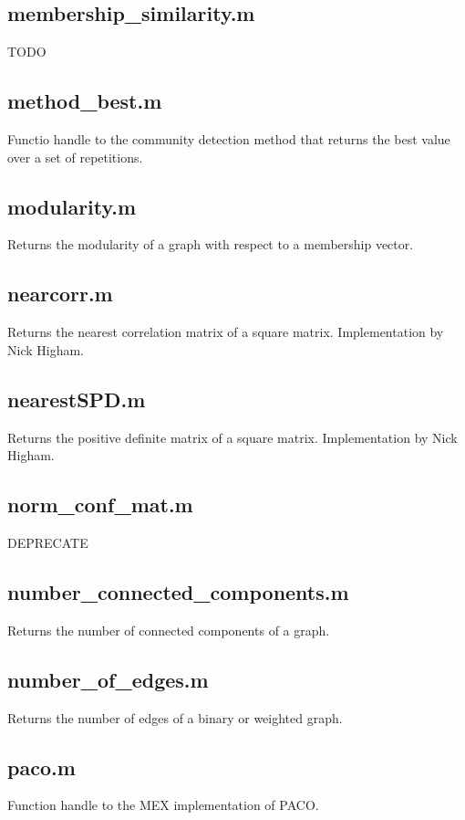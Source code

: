 \documentclass[a4paper]{report}
\begin{document}
  \subsection*{membership\_similarity.m} TODO

  \subsection*{method\_best.m} Functio handle to the community detection
  method that returns the best value over a set of repetitions.

  \subsection*{modularity.m} Returns the modularity of a graph with respect
  to a membership vector.

  \subsection*{nearcorr.m} Returns the nearest correlation matrix of a square
  matrix. Implementation by Nick Higham.

  \subsection*{nearestSPD.m} Returns the positive definite matrix of a square
  matrix. Implementation by Nick Higham.

  \subsection*{norm\_conf\_mat.m} DEPRECATE

  \subsection*{number\_connected\_components.m} Returns the number of
  connected components of a graph.

  \subsection*{number\_of\_edges.m} Returns the number of edges of a binary
  or weighted graph.

  \subsection*{paco.m} Function handle to the MEX implementation of PACO.
\end{document}
